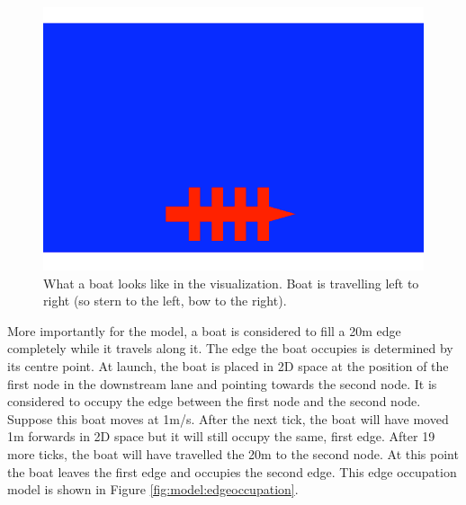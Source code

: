       \begin{figure}
      \begin{center}
      	\includegraphics[scale=0.3]{images/boat.png}
      	\caption{What a boat looks like in the visualization. Boat is travelling left to right (so stern to the left, bow to the right).}
      	\label{fig:model:boat}
      \end{center}
      \end{figure}
      
      More importantly for the model, a boat is considered to fill a 20m edge completely while it travels along it. The edge the boat occupies is determined by its centre point. At launch, the boat is placed in 2D space at the position of the first node in the downstream lane and pointing towards the second node. It is considered to occupy the edge between the first node and the second node. Suppose this boat moves at 1m/s. After the next tick, the boat will have moved 1m forwards in 2D space but it will still occupy the same, first edge. After 19 more ticks, the boat will have travelled the 20m to the second node. At this point the boat leaves the first edge and occupies the second edge. This edge occupation model is shown in Figure \ref{fig:model:edgeoccupation}.
      
